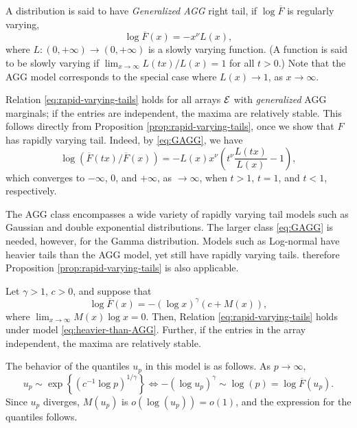 \begin{example} \label{exmp:AGG}
A distribution is said to have \emph{Generalized AGG} right tail, if $\log{\overline{F}}$ is regularly varying,
\begin{equation} \label{eq:GAGG}
    \log{\overline{F}(x)} = - x^\nu L(x),
\end{equation}
where $L: (0,+\infty)\to(0,+\infty)$ is a slowly varying function. (A function is said to be slowly varying if $\lim_{x\to\infty}L(tx)/L(x) = 1$ for all $t>0$.) Note that the AGG model corresponds to the special case where $L(x)\to 1$, as $x\to\infty$.

Relation \eqref{eq:rapid-varying-tails} holds for all arrays $\cal E$ with \emph{generalized} AGG marginals; if the entries are independent, the maxima are relatively stable. 
This follows directly from Proposition \ref{prop:rapid-varying-tails}, once we show that $F$ has rapidly varying tail. 
Indeed, by \eqref{eq:GAGG}, we have
$$
\log{\left(\overline{F}(tx)\Big/ \overline{F}(x)\right)} = - L(x)x^\nu\left(t^\nu\frac{L(tx)}{L(x)} - 1\right),
$$
which converges to $-\infty$, 0, and $+\infty$, as $\to\infty$, when $t>1$, $t=1$, and $t<1$, respectively.
\end{example}


The AGG class encompasses a wide variety of rapidly varying tail models such as Gaussian and double exponential distributions. The larger class \eqref{eq:GAGG} is needed, however, for the Gamma distribution.
Models such as Log-normal have heavier tails than the AGG model, yet still have rapidly varying tails. therefore Proposition \ref{prop:rapid-varying-tails} is also applicable.

\begin{example} \label{exmp:heavier-than-AGG}
Let $\gamma>1$, $c>0$, and suppose that
\begin{equation} \label{eq:heavier-than-AGG}
    \log{\overline{F}(x)} = - \left(\log x\right)^\gamma \left(c+M(x)\right),
\end{equation}
where $\lim_{x\to\infty} M(x)\log{x}= 0$. Then, Relation \eqref{eq:rapid-varying-tails} holds under 
model \eqref{eq:heavier-than-AGG}. Further, if the entries in the array independent, the 
maxima are relatively stable.

The behavior of the quantiles $u_p$ in this model is as follows. As $p\to\infty,$
\begin{equation*}
    u_p \sim \exp{\left\{\left(c^{-1}\log{p}\right)^{1/\gamma}\right\}}
    \iff - \left(\log{u_p}\right)^{\gamma} \sim \log(p) = \log \overline{F}(u_p).
\end{equation*}
Since $u_p$ diverges, $M(u_p)$ is $o(\log(u_p)) = o(1)$, and the expression for the quantiles follows.
\end{example}

